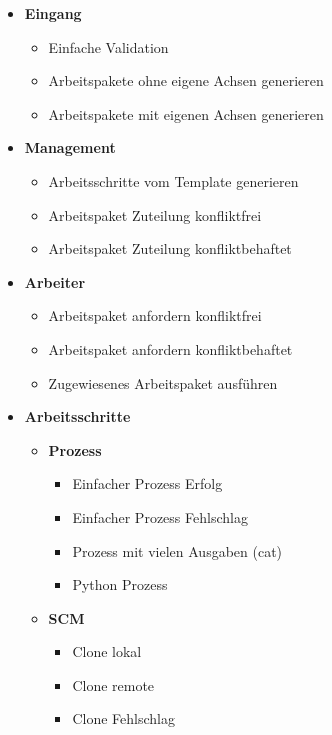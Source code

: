 \begin{itemize}
    \item
        \textbf{Eingang}
        \begin{itemize}
            \item Einfache Validation
            \item Arbeitspakete ohne eigene Achsen generieren
            \item Arbeitspakete mit eigenen Achsen generieren
        \end{itemize}
    \item
        \textbf{Management}
        \begin{itemize}
            \item Arbeitsschritte vom Template generieren
            \item Arbeitspaket Zuteilung konfliktfrei
            \item Arbeitspaket Zuteilung konfliktbehaftet
        \end{itemize}
    \item
        \textbf{Arbeiter}
        \begin{itemize}
            \item Arbeitspaket anfordern konfliktfrei
            \item Arbeitspaket anfordern konfliktbehaftet
            \item Zugewiesenes Arbeitspaket ausführen
        \end{itemize}
    \item
        \textbf{Arbeitsschritte}
        \begin{itemize}
            \item
                \textbf{Prozess}
                \begin{itemize}
                    \item Einfacher Prozess Erfolg
                    \item Einfacher Prozess Fehlschlag
                    \item Prozess mit vielen Ausgaben (cat)
                    \item Python Prozess
                \end{itemize}
            \item
                \textbf{SCM}
                \begin{itemize}
                    \item Clone lokal
                    \item Clone remote
                    \item Clone Fehlschlag
                \end{itemize}
        \end{itemize}
\end{itemize}




